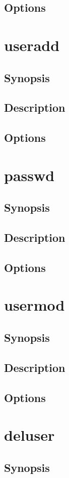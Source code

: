 \documentclass[a4paper, 10pt, onecolumn, openright, oneside]{book}
\begin{document}
			\subsection{Options}
		\section{useradd}
			\subsection{Synopsis}
			\subsection{Description}
			\subsection{Options}
		\section{passwd}
			\subsection{Synopsis}
			\subsection{Description}
			\subsection{Options}
		\section{usermod}
			\subsection{Synopsis}
			\subsection{Description}
			\subsection{Options}
		\section{deluser}
			\subsection{Synopsis}
\end{document}
